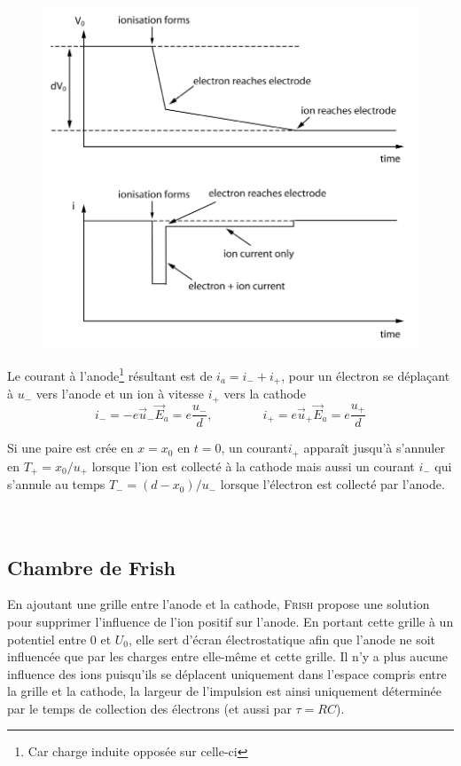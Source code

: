 	\begin{figure}
	\vspace{-8mm}
	\includegraphics[scale=0.3]{ch8/image4}
	\end{figure}
	
	Le courant à l'anode\footnote{Car charge induite opposée sur celle-ci} résultant est de $i_a=i_-
	+i_+$, pour un électron se déplaçant à $u_-$ vers l'anode et un ion à vitesse $i_+$ vers la
	cathode
	\begin{equation}
	i_-=-e\vec{u}_-\vec{E}_a=e\frac{u_-}{d},\qquad\qquad
	i_+=e\vec{u}_+\vec{E}_a=e\frac{u_+}{d}
	\end{equation}
	
	Si une paire est crée en $x=x_0$ en $t=0$, un courant$i_+$ apparaît jusqu'à s'annuler en 
	$T_+=x_0/u_+$ lorsque l'ion est collecté à la cathode mais aussi un courant $i_-$ qui 
	s'annule au temps $T_-=(d-x_0)/u_-$ lorsque l'électron est collecté par l'anode.\\
	\ \\
	\ \\

	\subsection{Chambre de Frish}
	En ajoutant une grille entre l'anode et la cathode, \textsc{Frish} propose une solution pour 
	supprimer l'influence de l'ion positif sur l'anode. En portant cette grille à un potentiel 
	entre 0 et $U_0$, elle sert d'écran électrostatique afin que l'anode ne soit influencée que
	par les charges entre elle-même et cette grille. Il n'y a plus aucune influence des ions
	puisqu'ils se déplacent uniquement dans l'espace compris entre la grille et la cathode, la
	largeur de l'impulsion est ainsi uniquement déterminée par le temps de collection des 
	électrons (et aussi par $\tau = RC$).

